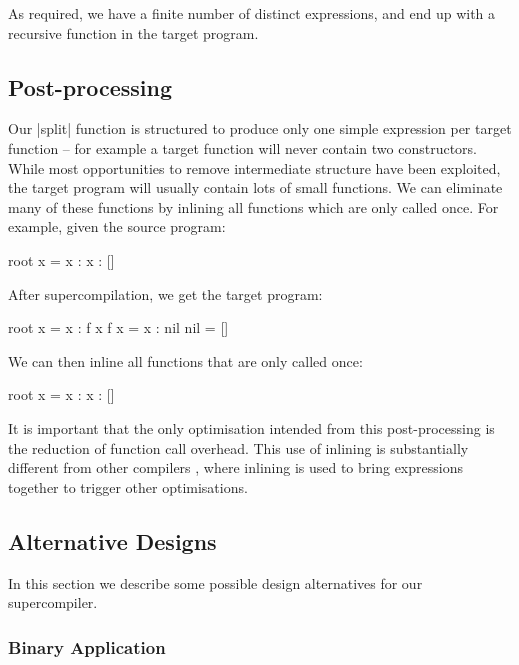 \documentclass[draft]{sigplanconf}
\begin{document}
As required, we have a finite number of distinct expressions, and end up with a recursive function in the target program.

\subsection{Post-processing}
\label{sec:postprocess}

Our |split| function is structured to produce only one simple expression per target function -- for example a target function will never contain two constructors. While most opportunities to remove intermediate structure have been exploited, the target program will usually contain lots of small functions. We can eliminate many of these functions by inlining all functions which are only called once. For example, given the source program:

\begin{code}
root x = x : x : []
\end{code}

\noindent After supercompilation, we get the target program:

\begin{code}
root x = x : f x
f x = x : nil
nil = []
\end{code}

\noindent We can then inline all functions that are only called once:

\begin{code}
root x = x : x : []
\end{code}

It is important that the only optimisation intended from this post-processing is the reduction of function call overhead. This use of inlining is substantially different from other compilers \cite{spj:inlining}, where inlining is used to bring expressions together to trigger other optimisations.

\subsection{Alternative Designs}
\label{sec:extensions}

In this section we describe some possible design alternatives for our supercompiler.

\subsubsection{Binary Application}
\label{sec:binaryapp}
\end{document}
